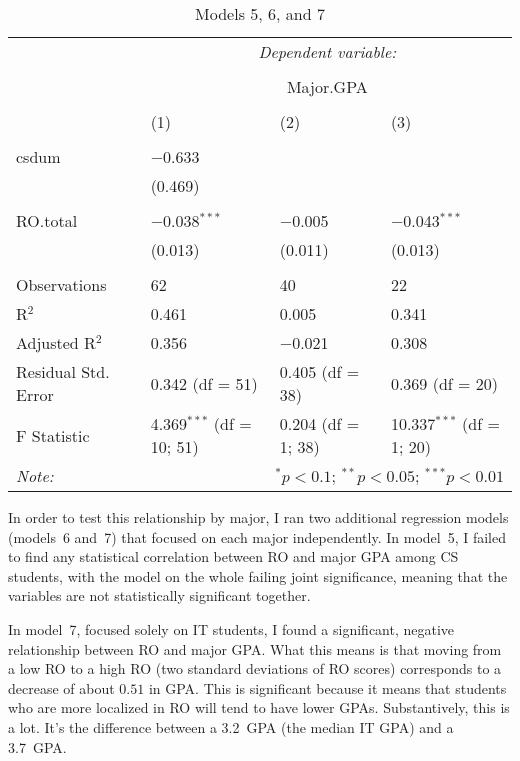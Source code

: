 \begin{table}[!htbp] \centering
  \caption[Models 5, 6, and 7]{Models 5, 6, and 7}
  \label{tab:c-models567}
  \begin{tabular}{@{\extracolsep{5pt}}llll}
    \toprule
     & \multicolumn{3}{c}{\textit{Dependent variable:}} \\
    \cline{2-4}
    \\[-1.8ex] & \multicolumn{3}{c}{Major.GPA} \\
    \\[-1.8ex] & (1) & (2) & (3)\\
    \hline \\[-1.8ex]
    csdum & $-$0.633 &  &  \\
      & (0.469) &  &  \\
      & & & \\
    RO.total & $-$0.038$^{***}$ & $-$0.005 & $-$0.043$^{***}$ \\
      & (0.013) & (0.011) & (0.013) \\
      & & & \\
    \midrule
    Observations & 62 & 40 & 22 \\
    R$^{2}$ & 0.461 & 0.005 & 0.341 \\
    Adjusted R$^{2}$ & 0.356 & $-$0.021 & 0.308 \\
    Residual Std. Error & 0.342 (df = 51) & 0.405 (df = 38) & 0.369 (df = 20) \\
    F Statistic & 4.369$^{***}$ (df = 10; 51) & 0.204 (df = 1; 38) & 10.337$^{***}$ (df = 1; 20) \\
    \bottomrule
    \textit{Note:}  & \multicolumn{3}{r}{$^{*}p<0.1$; $^{**}p<0.05$; $^{***}p<0.01$} \\
  \end{tabular}
\end{table}

In order to test this relationship by major, I ran two additional regression models (models~6 and~7) that focused on each major independently. In model~5, I failed to find any statistical correlation between RO and major GPA among CS students, with the model on the whole failing joint significance, meaning that the variables are not statistically significant together.

In model~7, focused solely on IT students, I found a significant, negative relationship between RO and major GPA. What this means is that moving from a low RO to a high RO (two standard deviations of RO scores) corresponds to a decrease of about $0.51$ in GPA. This is significant because it means that students who are more localized in RO will tend to have lower GPAs. Substantively, this is a lot. It's the difference between a 3.2~GPA (the median IT GPA) and a 3.7~GPA.


